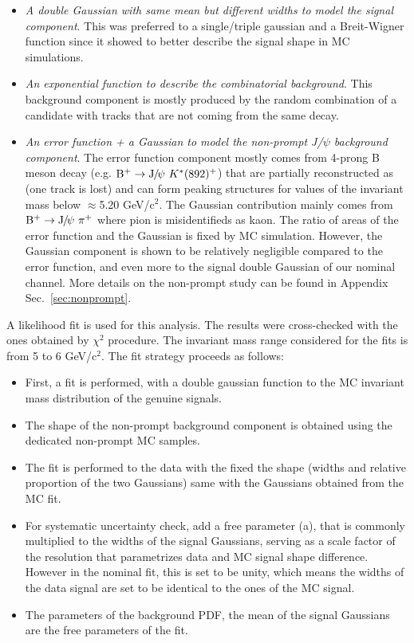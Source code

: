 \begin{itemize}
\item \textit{A double Gaussian with same mean but different widths to model the signal component}. This was preferred to a single/triple gaussian and a Breit-Wigner function since it showed to better describe the signal shape in MC simulations.
\item \textit{An exponential function to describe the combinatorial background}. This background component is mostly produced by the random combination of a \Jpsi candidate with tracks that are not coming from the same \Bplus decay.
\item \textit{An error function + a Gaussian to model the non-prompt J/$\psi$ background component}. The error function component mostly comes from 4-prong B meson decay (e.g. $\mathrm{B}^{+}\rightarrow\mathrm{J}\hspace{-.08em}/\hspace{-.14em}\psi~K^{*}(892)^{+}$) that are partially reconstructed as \Bplusdecay (one track is lost) and can form peaking structures for values of the invariant mass below $\approx$5.20 GeV/c$^2$. The Gaussian contribution mainly comes from $\mathrm{B}^{+}\rightarrow\mathrm{J}\hspace{-.08em}/\hspace{-.14em}\psi~\pi^{+}$ where pion is misidentifieds as kaon. The ratio of areas of the error function and the Gaussian is fixed by MC simulation. However, the Gaussian component is shown to be relatively negligible compared to the error function, and even more to the signal double Gaussian of our nominal channel. More details on the non-prompt \Jpsi study can be found in Appendix Sec.~\ref{sec:nonprompt}.
\end{itemize}

A likelihood fit is used for this analysis. The results were cross-checked with the ones obtained by $\chi^2$ procedure.
The invariant mass range considered for the fits is from 5 to 6 GeV/c$^2$. 
The fit strategy proceeds as follows:

\begin{itemize}
\item First, a fit is performed, with a double gaussian function to the MC invariant mass distribution of the genuine \Bplus signals.
\item The shape of the non-prompt background component is obtained using the dedicated non-prompt \Jpsi MC samples.
\item The fit is performed to the data with the fixed the shape (widths and relative proportion of the two Gaussians) same with the Gaussians obtained from the MC fit.
\item For systematic uncertainty check, add a free parameter (a), that is commonly multiplied to the widths of the signal Gaussians, serving as a scale factor of the resolution that parametrizes data and MC signal shape difference. However in the nominal fit, this is set to be unity, which means the widths of the data signal are set to be identical to the ones of the MC signal.
\item The parameters of the background PDF, the mean of the signal Gaussians are the free parameters of the fit.
\end{itemize}

